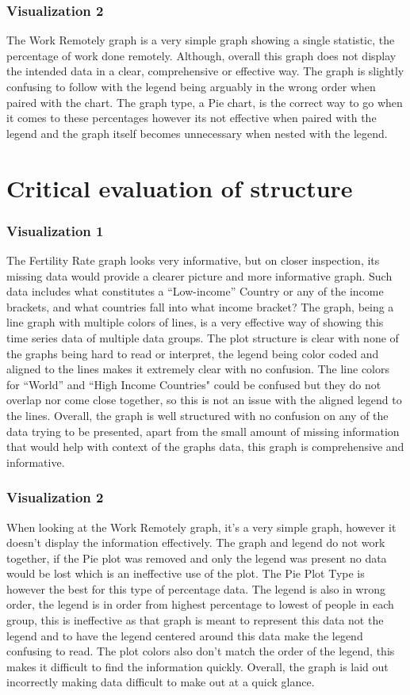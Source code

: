 \documentclass{article}
\begin{document}
\subsubsection{Visualization 2}
The Work Remotely graph is a very simple graph showing a single statistic, the percentage of work done remotely. Although, overall this graph does not display the intended data in a clear, comprehensive or effective way. The graph is slightly confusing to follow with the legend being arguably in the wrong order when paired with the chart.  The graph type, a Pie chart, is the correct way to go when it comes to these percentages however its not effective when paired with the legend and the graph itself becomes unnecessary when nested with the legend.


\section{Critical evaluation of structure}
\subsubsection{Visualization 1}
The Fertility Rate graph looks very informative, but on closer inspection, its missing data would provide a clearer picture and more informative graph. Such data includes what constitutes a “Low-income” Country or any of the income brackets, and what countries fall into what income bracket? The graph, being a line graph with multiple colors of lines, is a very effective way of showing this time series data of multiple data groups. The plot structure is clear with none of the graphs being hard to read or interpret, the legend being color coded and aligned to the lines makes it extremely clear with no confusion. The line colors for “World” and “High Income Countries" could be confused but they do not overlap nor come close together, so this is not an issue with the aligned legend to the lines. Overall, the graph is well structured with no confusion on any of the data trying to be presented, apart from the small amount of missing information that would help with context of the graphs data, this graph is comprehensive and informative.

\subsubsection{Visualization 2}
When looking at the Work Remotely graph, it’s a very simple graph, however it doesn’t display the information effectively. The graph and legend do not work together, if the Pie plot was removed and only the legend was present no data would be lost which is an ineffective use of the plot. The Pie Plot Type is however the best for this type of percentage data. The legend is also in wrong order, the legend is in order from highest percentage to lowest of people in each group, this is ineffective as that graph is meant to represent this data not the legend and to have the legend centered around this data make the legend confusing to read. The plot colors also don’t match the order of the legend, this makes it difficult to find the information quickly. Overall, the graph is laid out incorrectly making data difficult to make out at a quick glance.
\end{document}

